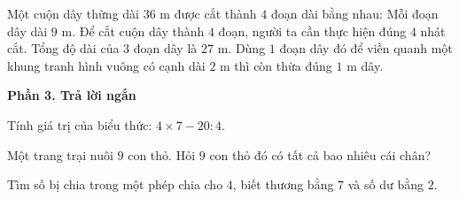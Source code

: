\begin{ex} %
Một cuộn dây thừng dài $36\text{ m}$ được cắt thành $4$ đoạn dài bằng nhau:
\choiceTF
{\True Mỗi đoạn dây dài $9\text{ m}$.}
{Để cắt cuộn dây thành $4$ đoạn, người ta cần thực hiện đúng $4$ nhát cắt.}
{\True Tổng độ dài của $3$ đoạn dây là $27\text{ m}$.}
{\True Dùng $1$ đoạn dây đó để viền quanh một khung tranh hình vuông có cạnh dài $2\text{ m}$ thì còn thừa đúng $1\text{ m}$ dây.}
\end{ex}

\textbf{Phần 3. Trả lời ngắn}

\begin{ex} %
Tính giá trị của biểu thức: $4 \times 7 - 20 : 4$.
\end{ex}

\begin{ex} %
Một trang trại nuôi $9$ con thỏ. Hỏi $9$ con thỏ đó có tất cả bao nhiêu cái chân?
\end{ex}

\begin{ex} %
Tìm số bị chia trong một phép chia cho $4$, biết thương bằng $7$ và số dư bằng $2$.
\end{ex}


